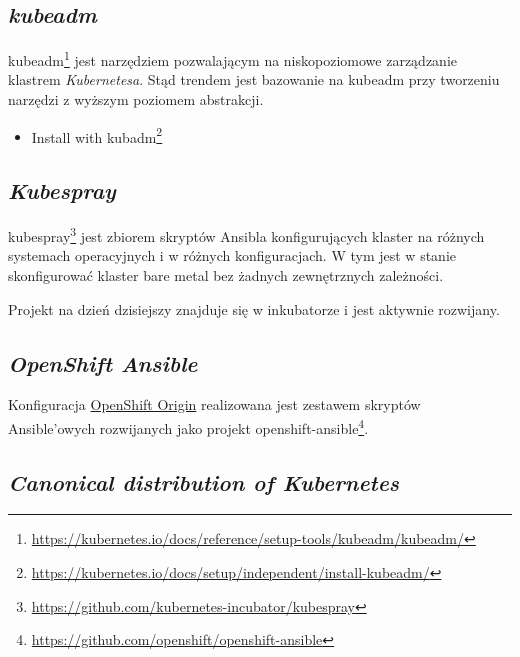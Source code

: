\documentclass[a4paper,12pt,twoside,openany]{report}
\providecommand{\tightlist}{%
  \setlength{\itemsep}{0pt}\setlength{\parskip}{0pt}}
\DeclareRobustCommand{\href}[2]{#2\footnote{\url{#1}}}
\begin{document}
\hypertarget{kubeadm}{%
\subsection{\texorpdfstring{\emph{kubeadm}}{kubeadm}}\label{kubeadm}}

\href{https://kubernetes.io/docs/reference/setup-tools/kubeadm/kubeadm/}{kubeadm}
jest narzędziem pozwalającym na niskopoziomowe zarządzanie klastrem
\emph{Kubernetesa}. Stąd trendem jest bazowanie na kubeadm przy
tworzeniu narzędzi z wyższym poziomem abstrakcji.

\begin{itemize}
\tightlist
\item
  \href{https://kubernetes.io/docs/setup/independent/install-kubeadm/}{Install
  with kubadm}
\end{itemize}

\hypertarget{kubespray}{%
\subsection{\texorpdfstring{\emph{Kubespray}}{Kubespray}}\label{kubespray}}

\href{https://github.com/kubernetes-incubator/kubespray}{kubespray} jest
zbiorem skryptów Ansibla konfigurujących klaster na różnych systemach
operacyjnych i w różnych konfiguracjach. W tym jest w stanie
skonfigurować klaster bare metal bez żadnych zewnętrznych zależności.

Projekt na dzień dzisiejszy znajduje się w inkubatorze i jest aktywnie
rozwijany.

\hypertarget{openshift-ansible}{%
\subsection{\texorpdfstring{\emph{OpenShift
Ansible}}{OpenShift Ansible}}\label{openshift-ansible}}

Konfiguracja \protect\hyperlink{openshift-origin}{OpenShift Origin}
realizowana jest zestawem skryptów Ansible'owych rozwijanych jako
projekt
\href{https://github.com/openshift/openshift-ansible}{openshift-ansible}.

\hypertarget{canonical-distribution-of-kubernetes}{%
\subsection{\texorpdfstring{\emph{Canonical distribution of
Kubernetes}}{Canonical distribution of Kubernetes}}\label{canonical-distribution-of-kubernetes}}
\end{document}
